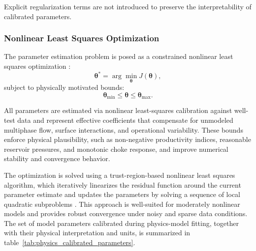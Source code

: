 \documentclass[12pt,APA]{uomthesis}
\begin{document}
Explicit regularization terms are not introduced to preserve the interpretability of calibrated parameters.

\subsubsection{Nonlinear Least Squares Optimization}
The parameter estimation problem is posed as a constrained nonlinear least squares optimization \citep{levenberg1944method, nocedal2006numerical}:
\begin{equation}
\boldsymbol{\theta}^* = \arg \min_{\boldsymbol{\theta}} J(\boldsymbol{\theta}),
\end{equation}
subject to physically motivated bounds:
\begin{equation}
\boldsymbol{\theta}_{\min} \le \boldsymbol{\theta} \le \boldsymbol{\theta}_{\max}.
\end{equation}

All parameters are estimated via nonlinear least-squares calibration against well-test data and represent effective coefficients that compensate for unmodeled multiphase flow, surface interactions, and operational variability.
These bounds enforce physical plausibility, such as non-negative productivity indices, reasonable reservoir pressures, and monotonic choke response, and improve numerical stability and convergence behavior.

The optimization is solved using a trust-region-based nonlinear least squares algorithm, which iteratively linearizes the residual function around the current parameter estimate and updates the parameters by solving a sequence of local quadratic subproblems \citep{nocedal2006numerical}. This approach is well-suited for moderately nonlinear models and provides robust convergence under noisy and sparse data conditions.
The set of model parameters calibrated during physics-model fitting, together with their physical interpretation and units, is summarized in table~\ref{tab:physics_calibrated_parameters}.
\end{document}
